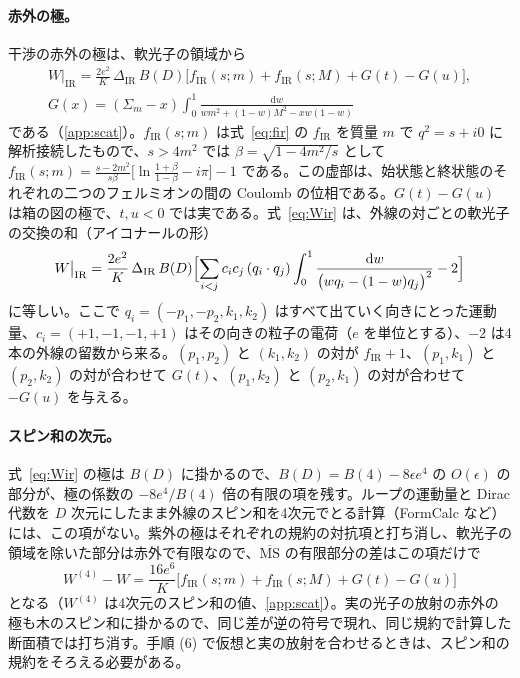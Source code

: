 \documentclass[a4paper,10pt]{ltjsarticle}
\newcommand{\dd}{\mathrm{d}}
\newcommand{\MSbar}{\overline{\mathrm{MS}}}
\newcommand{\DIR}{\Delta_{\mathrm{IR}}}
\begin{document}
\paragraph{赤外の極。}干渉の赤外の極は、軟光子の領域から
\begin{equation}
\begin{gathered}
W\big|_{\mathrm{IR}}=\frac{2e^2}{K}\,\DIR\,B(D)\bigl[f_{\mathrm{IR}}(s;m)+f_{\mathrm{IR}}(s;M)+G(t)-G(u)\bigr],\\
G(x)=(\Sigma_m-x)\int_0^1\frac{\dd w}{wm^2+(1-w)M^2-xw(1-w)}
\end{gathered}
\label{eq:Wir}
\end{equation}
である（\ref{app:scat}）。$f_{\mathrm{IR}}(s;m)$ は式~\eqref{eq:fir} の $f_{\mathrm{IR}}$ を質量 $m$ で $q^2=s+i0$ に解析接続したもので、$s>4m^2$ では $\beta=\sqrt{1-4m^2/s}$ として $f_{\mathrm{IR}}(s;m)=\frac{s-2m^2}{s\beta}\bigl[\ln\frac{1+\beta}{1-\beta}-i\pi\bigr]-1$ である。この虚部は、始状態と終状態のそれぞれの二つのフェルミオンの間の Coulomb の位相である。$G(t)-G(u)$ は箱の図の極で、$t,u<0$ では実である。式~\eqref{eq:Wir} は、外線の対ごとの軟光子の交換の和（アイコナールの形）
\begin{equation*}
W\big|_{\mathrm{IR}}=\frac{2e^2}{K}\,\DIR\,B(D)\Bigl[\sum_{i<j}c_ic_j\,(q_i\cdot q_j)\int_0^1\frac{\dd w}{\bigl(wq_i-(1-w)q_j\bigr)^2}-2\Bigr]
\end{equation*}
に等しい。ここで $q_i=(-p_1,-p_2,k_1,k_2)$ はすべて出ていく向きにとった運動量、$c_i=(+1,-1,-1,+1)$ はその向きの粒子の電荷（$e$ を単位とする）、$-2$ は4本の外線の留数から来る。$(p_1,p_2)$ と $(k_1,k_2)$ の対が $f_{\mathrm{IR}}+1$、$(p_1,k_1)$ と $(p_2,k_2)$ の対が合わせて $G(t)$、$(p_1,k_2)$ と $(p_2,k_1)$ の対が合わせて $-G(u)$ を与える。

\paragraph{スピン和の次元。}式~\eqref{eq:Wir} の極は $B(D)$ に掛かるので、$B(D)=B(4)-8\epsilon e^4$ の $O(\epsilon)$ の部分が、極の係数の $-8e^4/B(4)$ 倍の有限の項を残す。ループの運動量と Dirac 代数を $D$ 次元にしたまま外線のスピン和を4次元でとる計算（FormCalc など）には、この項がない。紫外の極はそれぞれの規約の対抗項と打ち消し、軟光子の領域を除いた部分は赤外で有限なので、$\MSbar$ の有限部分の差はこの項だけで
\begin{equation}
W^{(4)}-W=\frac{16e^6}{K}\bigl[f_{\mathrm{IR}}(s;m)+f_{\mathrm{IR}}(s;M)+G(t)-G(u)\bigr]
\label{eq:scheme}
\end{equation}
となる（$W^{(4)}$ は4次元のスピン和の値、\ref{app:scat}）。実の光子の放射の赤外の極も木のスピン和に掛かるので、同じ差が逆の符号で現れ、同じ規約で計算した断面積では打ち消す。手順 (6) で仮想と実の放射を合わせるときは、スピン和の規約をそろえる必要がある。
\end{document}
